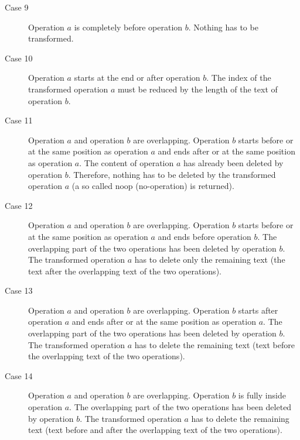 \begin{description}
 \item[Case 9] Operation $a$ is completely before operation $b$. Nothing has to be transformed. 
 \item[Case 10] Operation $a$ starts at the end or after operation $b$. The index of the transformed operation $a$ must be reduced by the length of the text of operation $b$.
 \item[Case 11] Operation $a$ and operation $b$ are overlapping. Operation $b$ starts before or at the same position as operation $a$ and ends after or at the same position as operation $a$. The content of operation $a$ has already been deleted by operation $b$. Therefore, nothing has to be deleted by the transformed operation $a$ (a so called noop (no-operation) is returned).
 \item[Case 12] Operation $a$ and operation $b$ are overlapping. Operation $b$ starts before or at the same position as operation $a$ and ends before operation $b$. The overlapping part of the two operations has been deleted by operation $b$. The transformed operation $a$ has to delete only the remaining text (the text after the overlapping text of the two operations).
 \item[Case 13] Operation $a$ and operation $b$ are overlapping. Operation $b$ starts after operation $a$ and ends after or at the same position as operation $a$. The overlapping part of the two operations has been deleted by operation $b$. The transformed operation $a$ has to delete the remaining text (text before the overlapping text of the two operations).
 \item[Case 14] Operation $a$ and operation $b$ are overlapping. Operation $b$ is fully inside operation $a$. The overlapping part of the two operations has been deleted by operation $b$. The transformed operation $a$ has to delete the remaining text (text before and after the overlapping text of the two operations).
\end{description}
